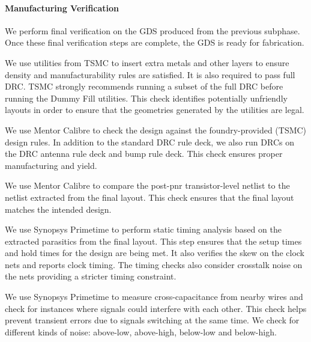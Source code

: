 \smallskip
\paragraph{Manufacturing Verification}
We perform final verification on the GDS produced from the previous
subphase. Once these final verification steps are complete, the GDS is
ready for fabrication.

\smallskip
\begin{cbxlist}{1.5em}{0em}{0.5em}

  \item {} We use utilities from
     TSMC to insert extra metals and other layers to ensure density and
     manufacturability rules are satisfied. It is also required to pass
     full DRC. TSMC strongly recommends running a subset of the full DRC
     before running the Dummy Fill utilities. This check identifies
     potentially unfriendly layouts in order to ensure that the
     geometries generated by the utilities are legal.

  \item {} We use Mentor Calibre to check
     the design against the foundry-provided (TSMC) design rules. In
     addition to the standard DRC rule deck, we also run DRCs on the DRC
     antenna rule deck and bump rule deck. This check ensures proper
     manufacturing and yield.

  \item {} We use Mentor Calibre to compare
     the post-pnr transistor-level netlist to the netlist extracted from
     the final layout. This check ensures that the final layout matches
     the intended design.

  \item {} We use Synopsys Primetime to perform static
     timing analysis based on the extracted parasitics from the final
     layout. This step ensures that the setup times and hold times for
     the design are being met. It also verifies the skew on the clock
     nets and reports clock timing. The timing checks also consider
     crosstalk noise on the nets providing a stricter timing constraint.

  \item {} We use Synopsys Primetime to
     measure cross-capacitance from nearby wires and check for instances
     where signals could interfere with each other. This check helps
     prevent transient errors due to signals switching at the same time.
     We check for different kinds of noise: above-low, above-high,
     below-low and below-high.


\end{cbxlist}
